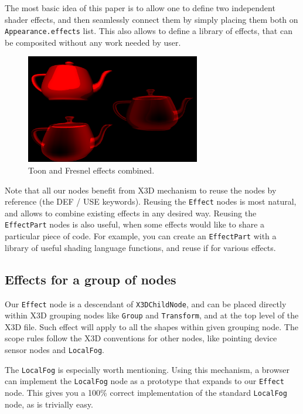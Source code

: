 \documentclass{acmsiggraph}                     %
\begin{document}
The most basic idea of this paper is to allow one to define two
independent shader effects, and then seamlessly connect them by simply
placing them both on \texttt{Appearance.effects} list. This also allows to
define a library of effects, that can be composited without any work
needed by user.

\begin{figure}[H]
  \centering
  \includegraphics[width=3in]{fresnel_and_toon}
  \caption{Toon and Fresnel effects combined.}
\end{figure}

Note that all our nodes benefit from X3D mechanism to reuse the nodes
by reference (the DEF / USE keywords). Reusing the \texttt{Effect} nodes
is most natural, and allows to combine existing effects in any desired way.
Reusing the \texttt{EffectPart} nodes is also useful, when some effects
would like to share a particular piece of code. For example,
you can create an \texttt{EffectPart} with a library of useful
shading language functions, and reuse if for various effects.

\subsection{Effects for a group of nodes}

Our \texttt{Effect} node is a descendant of \texttt{X3DChildNode},
and can be placed directly within X3D grouping nodes like
\texttt{Group} and \texttt{Transform}, and at the top level of the X3D file.
Such effect will apply to all the shapes within given grouping node.
The scope rules follow the X3D conventions for other nodes,
like pointing device sensor nodes and \texttt{LocalFog}.

The \texttt{LocalFog} is especially worth mentioning. Using this mechanism,
a browser can implement the \texttt{LocalFog} node as a prototype
that expands to our \texttt{Effect} node. This gives you a 100\% correct
implementation of the standard \texttt{LocalFog} node, as is trivially easy.
\end{document}
